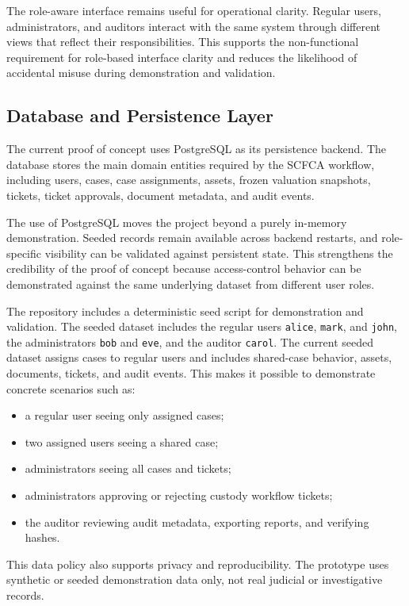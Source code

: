 \documentclass[12pt,a4paper]{report}
\begin{document}
The role-aware interface remains useful for operational clarity. Regular users, administrators, and auditors interact with the same system through different views that reflect their responsibilities. This supports the non-functional requirement for role-based interface clarity and reduces the likelihood of accidental misuse during demonstration and validation.

\subsection{Database and Persistence Layer}

The current proof of concept uses PostgreSQL as its persistence backend. The database stores the main domain entities required by the SCFCA workflow, including users, cases, case assignments, assets, frozen valuation snapshots, tickets, ticket approvals, document metadata, and audit events.

The use of PostgreSQL moves the project beyond a purely in-memory demonstration. Seeded records remain available across backend restarts, and role-specific visibility can be validated against persistent state. This strengthens the credibility of the proof of concept because access-control behavior can be demonstrated against the same underlying dataset from different user roles.

The repository includes a deterministic seed script for demonstration and validation. The seeded dataset includes the regular users \texttt{alice}, \texttt{mark}, and \texttt{john}, the administrators \texttt{bob} and \texttt{eve}, and the auditor \texttt{carol}. The current seeded dataset assigns cases to regular users and includes shared-case behavior, assets, documents, tickets, and audit events. This makes it possible to demonstrate concrete scenarios such as:

\begin{itemize}
    \item a regular user seeing only assigned cases;
    \item two assigned users seeing a shared case;
    \item administrators seeing all cases and tickets;
    \item administrators approving or rejecting custody workflow tickets;
    \item the auditor reviewing audit metadata, exporting reports, and verifying hashes.
\end{itemize}

This data policy also supports privacy and reproducibility. The prototype uses synthetic or seeded demonstration data only, not real judicial or investigative records.
\end{document}
